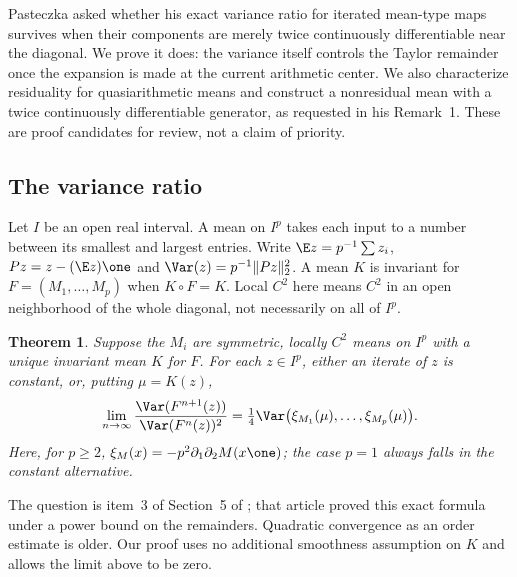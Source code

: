 \documentclass[11pt,a4paper]{article}
\numberwithin{equation}{section}
\newtheorem{theorem}{Theorem}[section]
\theoremstyle{definition}
\theoremstyle{remark}
\newenvironment{sectionabstract}{\par\smallskip\begingroup\small\noindent}{\par\endgroup\medskip}
\begin{document}
\begin{sectionabstract}
Pasteczka asked whether his exact variance ratio for iterated mean-type maps survives when their components are merely twice continuously differentiable near the diagonal. We prove it does: the variance itself controls the Taylor remainder once the expansion is made at the current arithmetic center. We also characterize residuality for quasiarithmetic means and construct a nonresidual mean with a twice continuously differentiable generator, as requested in his Remark~1. These are proof candidates for review, not a claim of priority.
\end{sectionabstract}
\subsection{The variance ratio}
Let $I$ be an open real interval. A mean on $I^p$ takes each input to a number between its smallest and largest entries. Write $\E z=p^{-1}\sum z_i$,
$Pz=z-(\E z)\one$ and $\Var(z)=p^{-1}\|Pz\|_2^2$. A mean $K$ is invariant for $F=(M_1,\ldots,M_p)$ when $K\circ F=K$. Local $C^2$ here means $C^2$ in an open neighborhood of the whole diagonal, not necessarily on all of $I^p$.
\begin{theorem}\label{r28showa:t:main}
Suppose the $M_i$ are symmetric, locally $C^2$ means on $I^p$ with a unique invariant mean $K$ for $F$. For each $z\in I^p$, either an iterate of $z$ is constant, or, putting $\mu=K(z)$,
\[
\lim_{n\to\infty}
\frac{\Var(F^{n+1}(z))}{\Var(F^n(z))^2}
=\tfrac14\Var\big(\xi_{M_1}(\mu),\ldots,\xi_{M_p}(\mu)\big).
\]
Here, for $p\ge2$, $\xi_M(x)=-p^2\partial_1\partial_2 M(x\one)$; the case $p=1$ always falls in the constant alternative.
\end{theorem}
The question is item~3 of Section~5 of \cite{r28showa:p}; that article proved this exact formula under a power bound on the remainders. Quadratic convergence as an order estimate is older. Our proof uses no additional smoothness assumption on $K$ and allows the limit above to be zero.
\end{document}
